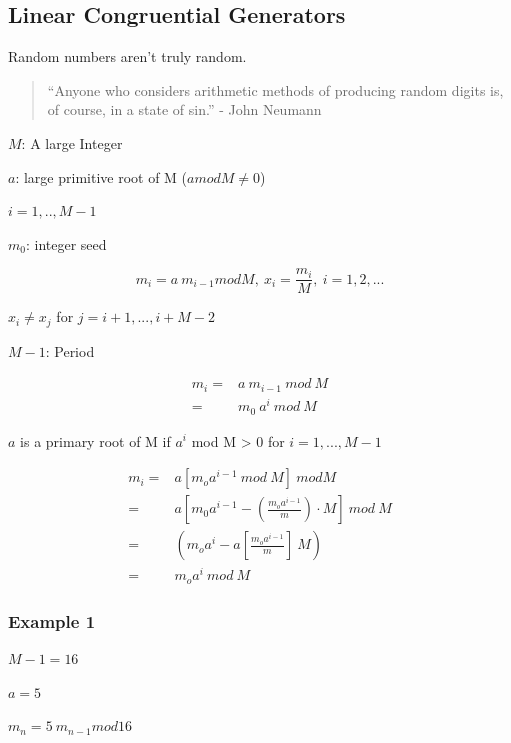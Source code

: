 \documentclass[11pt]{article}
\begin{document}
\subsection{Linear Congruential Generators}
\label{sec:org74114a9}

Random numbers aren't truly random.

\begin{quote}
``Anyone who considers arithmetic methods of producing random digits is, of
course, in a state of sin.'' - John Neumann
\end{quote}

\(M\): A large Integer

\(a\): large primitive root of M (\(a mod M \neq 0\))

\(i = 1,..,M - 1\)

\(m_0\): integer seed

$$m_i = a \ m_{i - 1} mod M, \ x_i = \frac{m_i}{M}, \ i = 1,2,...$$

\(x_i \neq x_j\) for \(j = i + 1, ..., i + M - 2\)

\(M - 1\): Period

\begin{equation}
\begin{split}
m_i = & a \ m_{i - 1} \ mod \ M\\
= & m_0 \ a^i \ mod \ M
\end{split}
\end{equation}

\(a\) is a primary root of M if \(a^i\) mod M > 0 for \(i = 1,..., M - 1\)


\begin{equation}
\begin{split}
m_i = & a[m_o a^{i - 1} \ mod \ M] \ mod M\\
= & a[m_0 a^{i -1} - (\frac{m_o a^{i - 1}}{m}) \cdot M] \ mod \ M\\
= & (m_o a^i - a[\frac{m_o a^{i - 1}}{m}] \ M)\\
= & m_o a^i \ mod \ M
\end{split}
\end{equation}

\subsubsection{Example 1}
\label{sec:orgd94a9c8}

\(M - 1 = 16\)

\(a = 5\)

\(m_n = 5 \ m_{n - 1} mod 16\)
\end{document}
